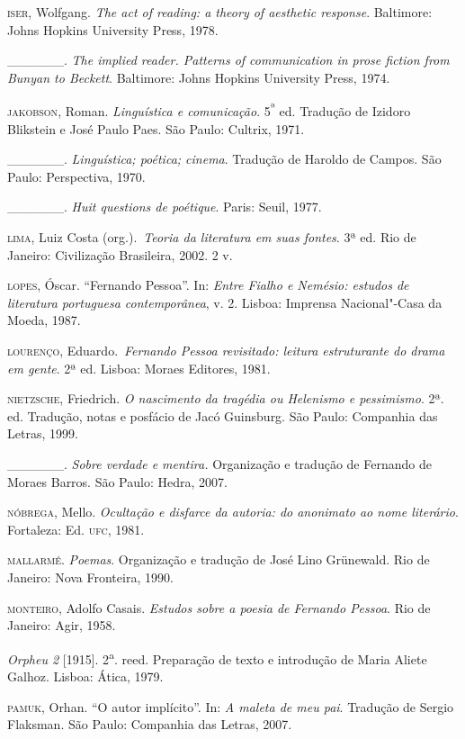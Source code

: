 \begin{Parskip}
\textsc{iser}, Wolfgang. \emph{The act of reading: a theory of
aesthetic response}. Baltimore: Johns Hopkins University Press, 1978.

\_\_\_\_\_\_. \emph{The implied reader. Patterns of communication in
prose fiction from Bunyan to Beckett}. Baltimore: Johns Hopkins
University Press, 1974.

\textsc{jakobson}, Roman. \emph{Linguística e comunicação}.
5\textsuperscript{ª} ed. Tradução de Izidoro Blikstein e José Paulo
Paes. São Paulo: Cultrix, 1971.

\textsc{\_\_\_\_\_\_.} \emph{Linguística; poética; cinema}. Tradução de
Haroldo de Campos. São Paulo: Perspectiva, 1970.

\_\_\_\_\_\_. \emph{Huit questions de poétique}. Paris: Seuil, 1977.

\textsc{lima}, Luiz Costa (org.).~\emph{Teoria da literatura em suas
fontes}. 3ª ed. Rio de Janeiro: Civilização Brasileira, 2002. 2 v.

\textsc{lopes}, Óscar. ``Fernando Pessoa''. In: \emph{Entre Fialho e
Nemésio: estudos de literatura portuguesa contemporânea}, v. 2. Lisboa:
Imprensa Nacional"-Casa da Moeda, 1987.

\textsc{lourenço}, Eduardo.~\emph{Fernando Pessoa revisitado: leitura
estruturante do drama em gente}. 2ª ed. Lisboa: Moraes Editores,
1981.

\textsc{nietzsche}, Friedrich. \emph{O nascimento da tragédia ou Helenismo e
pessimismo}. 2ª. ed. Tradução, notas e posfácio de Jacó Guinsburg. São
Paulo: Companhia das Letras, 1999.

\_\_\_\_\_\_. \emph{Sobre verdade e mentira.} Organização e tradução de
Fernando de Moraes Barros. São Paulo: Hedra, 2007.

\textsc{nóbrega}, Mello. \emph{Ocultação e disfarce da autoria: do
anonimato ao nome literário}. Fortaleza: Ed. \textsc{ufc}, 1981.

\textsc{mallarmé}. \emph{Poemas}. Organização e tradução de José Lino
Grünewald. Rio de Janeiro: Nova Fronteira, 1990.

\textsc{monteiro}, Adolfo Casais. \emph{Estudos sobre a poesia de
Fernando Pessoa}. Rio de Janeiro: Agir, 1958.

\emph{Orpheu 2} {[}1915{]}. 2\textsuperscript{a}. reed. Preparação de
texto e introdução de Maria Aliete Galhoz. Lisboa: Ática, 1979.

\textsc{pamuk}, Orhan. ``O autor implícito''. In: \emph{A maleta de meu
pai}. Tradução de Sergio Flaksman. São Paulo: Companhia das Letras,
2007.


\end{Parskip}
